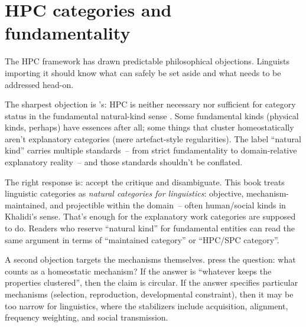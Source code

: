\section{HPC categories and fundamentality}
\label{sec:4:hpc-not-natural-kinds}

The HPC framework has drawn predictable philosophical objections. Linguists importing it should know what can safely be set aside and what needs to be addressed head-on.

The sharpest objection is \citeauthor{magnus2014}'s: HPC is neither necessary nor sufficient for category status in the fundamental natural-kind sense \citep{magnus2014}. Some fundamental kinds (physical kinds, perhaps) have essences after all; some things that cluster homeostatically aren't explanatory categories (mere artefact-style regularities). The label \enquote{natural kind} carries multiple standards~-- from strict fundamentality to domain-relative explanatory reality~-- and those standards shouldn't be conflated.

The right response is: accept the critique and disambiguate. This book treats linguistic categories as \emph{natural categories for linguistics}: objective, mechanism-maintained, and projectible within the domain~-- often human/social kinds in Khalidi's sense. That's enough for the explanatory work categories are supposed to do. Readers who reserve \enquote{natural kind} for fundamental entities can read the same argument in terms of \enquote{maintained category} or \enquote{HPC/SPC category}.

A second objection targets the mechanisms themselves. \textcite{onishi2022} press the question: what counts as a homeostatic mechanism? If the answer is \enquote{whatever keeps the properties clustered}, then the claim is circular. If the answer specifies particular mechanisms (selection, reproduction, developmental constraint), then it may be too narrow for linguistics, where the stabilizers include acquisition, alignment, frequency weighting, and social transmission.

